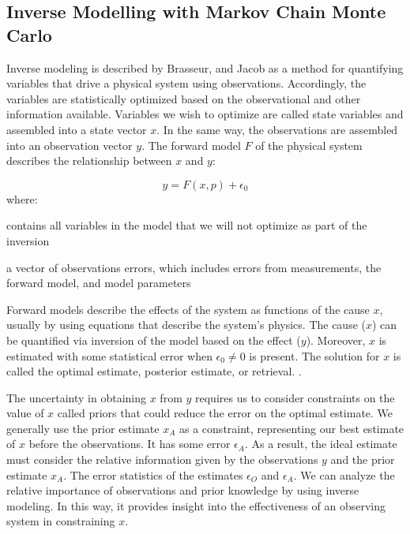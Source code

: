 \subsection{ Inverse Modelling with Markov Chain Monte Carlo}
\begin{flushleft}
    Inverse modeling is described by Brasseur, and Jacob \cite{brasseur_modeling_2017} as a method for quantifying variables that drive a physical system using observations. Accordingly, the variables are statistically optimized based on the observational and other information available. Variables we wish to optimize are called state variables and assembled into a state vector $x$. In the same way, the observations are assembled into an observation vector $y$. The forward model $F$ of the physical system describes the relationship between $x$ and $y$:

    \begin{equation}
\label{inverse_model}
y=F(x,p) + \epsilon_0
\end{equation}
where:\\
\begin{description}[leftmargin=!,labelwidth={3 em}]
    \item [$p$] contains all variables in the model that we will not optimize as part of the inversion
    \item [$\epsilon_0$] a vector of observations errors, which includes errors from measurements, the forward model, and model parameters 
\end{description}
 Forward models describe the effects of the system as functions of the cause $x$, usually by using equations that describe the system's physics. The cause ($x$) can be quantified via inversion of the model based on the effect ($y$). Moreover, $x$ is estimated with some statistical error when $\epsilon_0 \neq 0$ is present. The solution for $x$ is called the optimal estimate, posterior estimate, or retrieval. \cite{brasseur_modeling_2017}. 
 \end{flushleft}

\begin{flushleft}
    The uncertainty in obtaining $x$ from $y$ requires us to consider constraints on the value of $x$ called priors that could reduce the error on the optimal estimate.  We generally use the prior estimate $x_A$ as a constraint, representing our best estimate of $x$ before the observations. It has some error $\epsilon_A$. As a result, the ideal estimate must consider the relative information given by the observations $y$ and the prior estimate $x_A$. The error statistics of the estimates $\epsilon_O$ and $\epsilon_A$. We can analyze the relative importance of observations and prior knowledge by using inverse modeling. In this way, it provides insight into the effectiveness of an observing system in constraining $x$\cite{brasseur_modeling_2017}.

    \end{flushleft}


